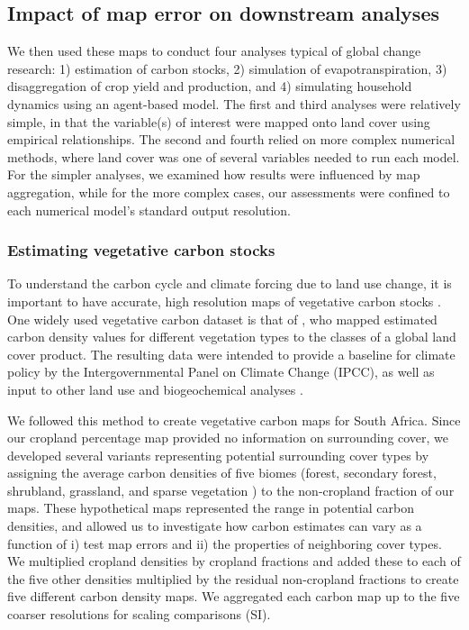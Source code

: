 \documentclass[a4paper]{article}
\begin{document}
\subsection*{Impact of map error on downstream analyses}
\vspace{-0.2 cm}
We then used these maps to conduct four analyses typical of global change research: 1) estimation of carbon stocks, 2) simulation of evapotranspiration, 3) disaggregation of crop yield and production, and 4) simulating household dynamics using an agent-based model. The first and third analyses were relatively simple, in that the variable(s) of interest were mapped onto land cover using empirical relationships. The second and fourth relied on more complex numerical methods, where land cover was one of several variables needed to run each model. For the simpler analyses, we examined how results were influenced by map aggregation, while for the more complex cases, our assessments were confined to each numerical model's standard output resolution. 

\vspace{-0.3 cm}
\subsubsection*{Estimating vegetative carbon stocks}
\vspace{-0.2 cm}
To understand the carbon cycle and climate forcing due to land use change, it is important to have accurate, high resolution maps of vegetative carbon stocks \citep[][]{searchinger_high_2015}. One widely used vegetative carbon dataset is that of \citep{ruesch_new_2008}, who mapped estimated carbon density values for different vegetation types to the classes of a global land cover product. The resulting data were intended to provide a baseline for climate policy by the Intergovernmental Panel on Climate Change (IPCC), as well as input to other land use and biogeochemical analyses \citep{ruesch_new_2008}. 

We followed this method to create vegetative carbon maps for South Africa. Since our cropland percentage map provided no information on surrounding cover, we developed several variants representing potential surrounding cover types by assigning the average carbon densities of five biomes (forest, secondary forest, shrubland, grassland, and sparse vegetation \citep{ruesch_new_2008}) to the non-cropland fraction of our maps. These hypothetical maps represented the range in potential carbon densities, and allowed us to investigate how carbon estimates can vary as a function of i) test map errors and ii) the properties of neighboring cover types. We multiplied cropland densities by cropland fractions and added these to each of the five other densities multiplied by the residual non-cropland fractions to create five different carbon density maps. We aggregated each carbon map up to the five coarser resolutions for scaling comparisons (SI). 
\end{document}
